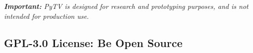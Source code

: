 \textit{\textbf{Important:}
PyTV is designed for research and prototyping purposes,
and is not intended for production use.}

\subsection{GPL-3.0 License: Be Open Source}
